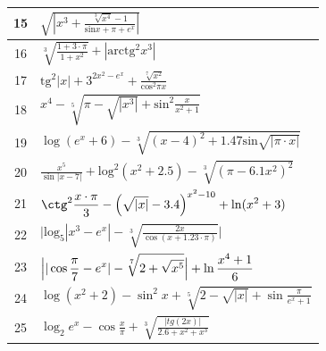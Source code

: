 \begin{longtable}{|c|l|}
15 &
$\displaystyle
\sqrt{\left|x^{3}+\frac{\sqrt[{3}]{x^{4}}-1}{\text{sin}x+\pi +e^{x}}\right|}
$
\\\hline
16 &
$\displaystyle
\sqrt[{{3}}]{\frac{1+3\cdot \pi }{1+x^{2}}}+|\text{arctg}^{{2}}x^{{3}}|
$
\\\hline
17 &
$\displaystyle
\text{tg}^{2}|x|+3^{2x^{2}-e^{x}}+\frac{\sqrt[{7}]{x^{2}}}{\text{cos}^{2}\mathit{\pi x}}
$
\\\hline
18 &
$\displaystyle
x^{4}-\sqrt[{5}]{\pi -\sqrt{|x^{3}|}+\text{sin}^{2}\frac{x}{x^{2}+1}}
$
\\\hline
19 &
$\displaystyle
\log (e^{x}+6)-\sqrt[{3}]{(x-4)^{2}+1.47\text{sin}\sqrt{|\pi \cdot x|}}
$
\\\hline
20 &
$\displaystyle
\frac{x^{5}}{\sin |x-7|}+\text{log}^{2}(x^{2}+2.5)-\sqrt[{3}]{(\pi -6.1x^{2})^{2}}
$
\\\hline
21 &
$\displaystyle
\ctg^2\frac{x\cdot \pi }{3}-\Bigl(\sqrt{|x|}-3.4\Bigr)^{x^{2}-10}+\ln (x^{2}+3)
$
\\\hline
22 &
$\displaystyle
\Biggl|\text{log}_{5}|x^{3}-e^{x}|-\sqrt[{{3}}]{\frac{2x}{\cos (x+1.23\cdot \pi )}}\Biggr|
$
\\\hline
23 &
$\displaystyle
\Bigl||\cos \frac{\pi }{7}-e^{x}|-\sqrt[{7}]{2+\sqrt{x^{5}}}\Bigr|+\ln \frac{x^{4}+1}{6}
$
\\\hline
24 &
$\displaystyle
\log (x^{2}+2)-\sin ^{2}x+\sqrt[{5}]{2-\sqrt{|x|}+\sin \frac{\pi }{e^{x}+1}}
$
\\\hline
25 &
$\displaystyle
\log _{2}e^{x}-\cos \frac{x}{\pi }+\sqrt[{3}]{\frac{|\mathit{tg}(2x)|}{2.6+x^{2}+x^{3}}}
$
\\\hline
\end{longtable}

